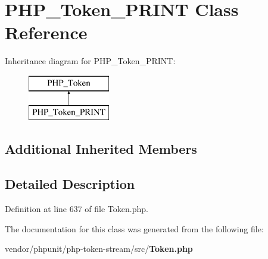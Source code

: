 \section{P\+H\+P\+\_\+\+Token\+\_\+\+P\+R\+I\+N\+T Class Reference}
\label{class_p_h_p___token___p_r_i_n_t}
Inheritance diagram for P\+H\+P\+\_\+\+Token\+\_\+\+P\+R\+I\+N\+T\+:\begin{figure}[H]
\begin{center}
\leavevmode
\includegraphics[height=2.000000cm]{class_p_h_p___token___p_r_i_n_t}
\end{center}
\end{figure}
\subsection*{Additional Inherited Members}


\subsection{Detailed Description}


Definition at line 637 of file Token.\+php.



The documentation for this class was generated from the following file\+:\begin{DoxyCompactItemize}
\item 
vendor/phpunit/php-\/token-\/stream/src/{\bf Token.\+php}\end{DoxyCompactItemize}
